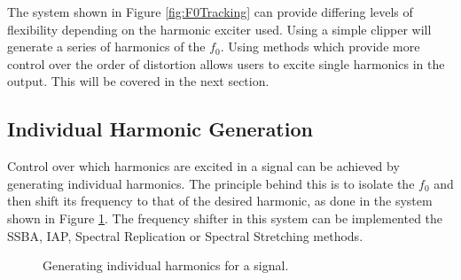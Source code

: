 		The system shown in Figure \ref{fig:F0Tracking} can provide differing levels of flexibility depending on
		the harmonic exciter used. Using a simple clipper will generate a series of harmonics of the $f_{0}$. Using
		methods which provide more control over the order of distortion allows users to excite single harmonics in
		the output. This will be covered in the next section.

	\subsection{Individual Harmonic Generation}
	\label{sec:FeatureControl-Systems-Individuals}
		Control over which harmonics are excited in a signal can be achieved by generating individual harmonics.
		The principle behind this is to isolate the $f_{0}$ and then shift its frequency to that of the desired
		harmonic, as done in the system shown in Figure \ref{fig:HarmonicGenerationSystem}.  The frequency shifter
		in this system can be implemented the SSBA, IAP, Spectral Replication or Spectral Stretching methods.

		\begin{figure}[h!]
			\centering
			\caption{Generating individual harmonics for a signal.}
			\label{fig:HarmonicGenerationSystem}
		\end{figure}


